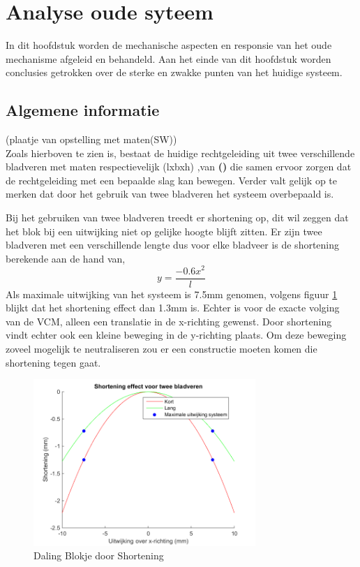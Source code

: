 \documentclass[a4paper]{article}
\begin{document}
\section{Analyse oude syteem}
In dit hoofdstuk worden de mechanische aspecten en responsie van het oude mechanisme afgeleid en behandeld. Aan het einde van dit hoofdstuk worden conclusies getrokken over de sterke en zwakke punten van het huidige systeem.

\subsection{Algemene informatie}
(plaatje van opstelling met maten(SW)) \\
Zoals hierboven te zien is, bestaat de huidige rechtgeleiding uit twee verschillende bladveren met maten respectievelijk (lxbxh) ,van \textbf{()} die samen ervoor zorgen dat de rechtgeleiding met een bepaalde slag kan bewegen. Verder valt gelijk op te merken dat door het gebruik van twee bladveren het systeem overbepaald is.

Bij het gebruiken van twee bladveren treedt er shortening op, dit wil zeggen dat het blok bij een uitwijking niet op gelijke hoogte blijft zitten. Er zijn twee bladveren met een verschillende lengte dus voor elke bladveer is de shortening berekende aan de hand van,
\begin{equation}
y=\frac{-0.6x^2}{l}
\end{equation}
Als maximale uitwijking van het systeem is 7.5mm genomen, volgens figuur \ref{Shortening} blijkt dat het shortening effect dan 1.3mm is. Echter is voor de exacte volging van de VCM, alleen een translatie in de x-richting gewenst. Door shortening vindt echter ook een kleine beweging in de y-richting plaats. Om deze beweging zoveel mogelijk te neutraliseren zou er een constructie moeten komen die shortening tegen gaat. 
\begin{figure}[h]
\label{Shortening}
\centering
\includegraphics[width=0.75\textwidth]{Shortening.png}
\caption{Daling Blokje door Shortening}
\end{figure}
\end{document}
